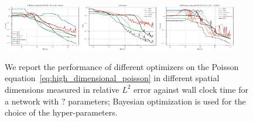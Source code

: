 \begin{figure}
    \centering
    \includegraphics[width=0.3\textwidth]{kfac_pinns_exp/exp26_poisson5d_mlp_tanh_256_bayes/l2_error_over_time.pdf}
    \includegraphics[width=0.3\textwidth]{kfac_pinns_exp/exp21_poisson_10d/loss_over_time.pdf}
    \includegraphics[width=0.3\textwidth]{kfac_pinns_exp/exp14_poisson_100d_weinan/l2_error_over_time.pdf}
    \caption{
    We report the performance of different optimizers on the Poisson equation~\eqref{eq:high_dimensional_poisson} in different spatial dimensions measured in relative $L^2$ error against wall clock time for a network with $?$ parameters; Bayesian optimization is used for the choice of the hyper-parameters.
    }
    \label{fig:10D-Poisson}
\end{figure}



